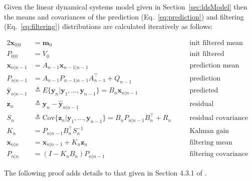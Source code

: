 \begin{theorem}
	\label{thm:kalmanFilterEqs}

    Given the linear dynamical systems model given in
    Section~\ref{sec:ldsModel} then the means and covariances of the prediction
    (Eq.~\ref{eq:prediction}) and filtering (Eq.~\ref{eq:filtering})
    distributions are calculated iteratively as follows:

    \begin{alignat}{2}
        \mathbf{x}_{0|0}&=\mathbf{m}_0&&\text{init filtered mean}\label{eq:x0G0}\\
        P_{0|0}&=V_0&&\text{init filtered covariance}\label{eq:P0G0}\\
        \mathbf{x}_{n|n-1}&=A_{n-1}\mathbf{x}_{n-1|n-1}&&\text{prediction mean}\label{eq:xtGtm1}\\
        P_{n|n-1}&=A_{n-1}P_{n-1|n-1}A_{n-1}^\intercal+Q_{n-1}&&\text{prediction covariance}\label{eq:PtGtm1}\\
        \hat{\mathbf{y}}_{n|n-1}&\triangleq E\{\mathbf{y}_n|\mathbf{y}_1,\ldots,\mathbf{y}_{n-1}\}=B_n\mathbf{x}_{n|n-1}&&\text{predicted observation}\label{eq:ytGtm1}\\
        \mathbf{z}_n&\triangleq\mathbf{y}_n-\hat{\mathbf{y}}_{n|n-1}&&\text{residual}\nonumber\\
        S_n&\triangleq \text{Cov}\{\mathbf{z}_n|\mathbf{y}_1,\ldots,\mathbf{y}_{n-1}\}=B_nP_{n|n-1}B_n^\intercal+R_n\quad&&\text{residual covariance}\label{eq:St}\\
        K_n&=P_{n|n-1}B_n^\intercal S_n^{-1}&&\text{Kalman gain}\label{eq:Kt}\\
        \mathbf{x}_{n|n}&=\mathbf{x}_{n|n-1}+K_n\mathbf{z}_n&&\text{filtering mean}\label{eq:xtGt}\\
        P_{n|n}&=(I-K_nB_n)P_{n|n-1}&&\text{filtering covariance}\label{eq:PtGt}
    \end{alignat}

\end{theorem}

The following proof adds details to that given in Section 4.3.1 of
\citet{durbinAndKoopman12}.

